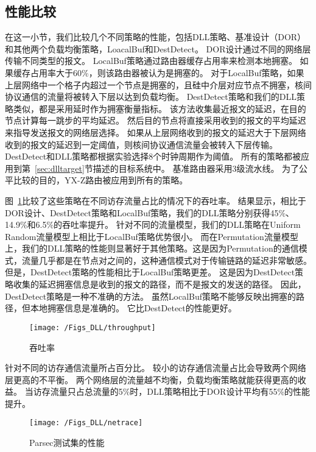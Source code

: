 \subsection{性能比较}

在这一小节，我们比较几个不同策略的性能，包括DLL策略、基准设计（DOR）和其他两个负载均衡策略，LoacalBuf和DestDetect。
DOR设计通过不同的网络层传输不同类型的报文。
LocalBuf策略通过路由器缓存占用率来检测本地拥塞。
如果缓存占用率大于60\%，则该路由器被认为是拥塞的。
对于LocalBuf策略，如果上层网络中一个格子内超过一个节点是拥塞的，且硅中介层对应节点不拥塞，核间协议通信的流量将被转入下层以达到负载均衡。
DestDetect策略和我们的DLL策略类似，都是采用延时作为拥塞衡量指标。
该方法收集最近报文的延迟，在目的节点计算每一跳步的平均延迟。
然后目的节点将直接采用收到的报文的平均延迟来指导发送报文的网络层选择。
如果从上层网络收到的报文的延迟大于下层网络收到的报文的延迟到一定阈值，则核间协议通信流量会被转入下层传输。
DestDetect和DLL策略都根据实验选择8个时钟周期作为阈值。
所有的策略都被应用到第~\ref{sec:dlltarget}节描述的目标系统中。
基准路由器采用3级流水线。
为了公平比较的目的，YX-Z路由被应用到所有的策略。

图~\ref{fig:throughput}比较了这些策略在不同访存流量占比的情况下的吞吐率。
结果显示，相比于DOR设计、DestDetect策略和LocalBuf策略，我们的DLL策略分别获得45\%、14.9\%和6.5\%的吞吐率提升。
针对不同的流量模型，我们的DLL策略在Uniform Random流量模型上相比于LocalBuf策略优势很小。
而在Permutation流量模型上，我们的DLL策略的性能则显著好于其他策略。这是因为Permutation的通信模式，流量几乎都是在节点对之间的，这种通信模式对于传输链路的延迟非常敏感。
但是，DestDetect策略的性能相比于LocalBuf策略更差。
这是因为DestDetect策略收集的延迟拥塞信息是收到的报文的路径，而不是报文的发送的路径。
因此，DestDetect策略是一种不准确的方法。
虽然LocalBuf策略不能够反映出拥塞的路径，但本地拥塞信息是准确的。
它比DestDetect的性能更好。


\begin{figure}[htbp] %
  \centering
  \texttt{[image: /Figs\_DLL/throughput]}
  \caption{吞吐率}
  \label{fig:throughput}
\end{figure}


针对不同的访存通信流量所占百分比。
较小的访存通信流量占比会导致两个网络层更高的不平衡。
两个网络层的流量越不均衡，负载均衡策略就能获得更高的收益。
当访存流量只占总流量的5\%时，DLL策略相比于DOR设计平均有55\%的性能提升。



\begin{figure}[htbp] %
  \centering
  \texttt{[image: /Figs\_DLL/netrace]}
  \caption{Parsec测试集的性能}
  \label{fig:netrace}
\end{figure}

